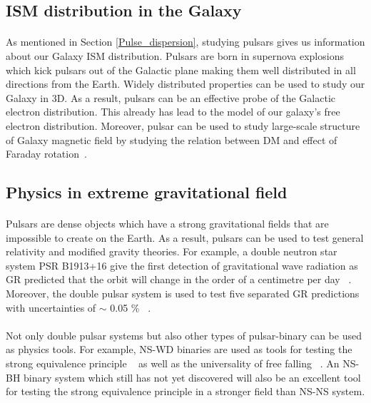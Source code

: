\documentclass[thesis_msc.tex]{subfiles}
\begin{document}
    \subsection{ISM distribution in the Galaxy}
    \paragraph{} As mentioned in Section \ref{Pulse_dispersion}, studying pulsars gives us information about our Galaxy ISM distribution. Pulsars are born in supernova explosions which kick pulsars out of the Galactic plane making them well distributed in all directions from the Earth. Widely distributed properties can be used to study our Galaxy in 3D. As a result, pulsars can be an effective probe of the Galactic electron distribution. This already has lead to the model of our galaxy's free electron distribution. Moreover, pulsar can be used to study large-scale structure of Galaxy magnetic field by studying the relation between DM and effect of Faraday rotation~\citep{doi:10.1111/j.1365-2966.2008.13188.x}. 
    
    \subsection{Physics in extreme gravitational field}
    \paragraph{} Pulsars are dense objects which have a strong gravitational fields that are impossible to create on the Earth. As a result, pulsars can be used to test general relativity and modified gravity theories. For example, a double neutron star system PSR B1913+16 give the first detection of gravitational wave radiation as GR predicted that the orbit will change in the order of a centimetre per day ~\citep{weisberg2004relativistic}. Moreover, the double pulsar system is used to test five separated GR predictions with uncertainties of $\sim$ 0.05  \%  ~\citep{kramer2006tests}.  
    \paragraph{} Not only double pulsar systems but also other types of pulsar-binary can be used as physics tools. For example, NS-WD binaries are used as tools for testing the strong equivalence principle ~\citep{zhu2018tests} as well as the universality of free falling ~\citep{PhysRevLett.120.241104}. An NS-BH binary system which still has  not yet discovered will also be an excellent tool for testing the strong equivalence principle in a stronger field than NS-NS system. 
        
\end{document}
